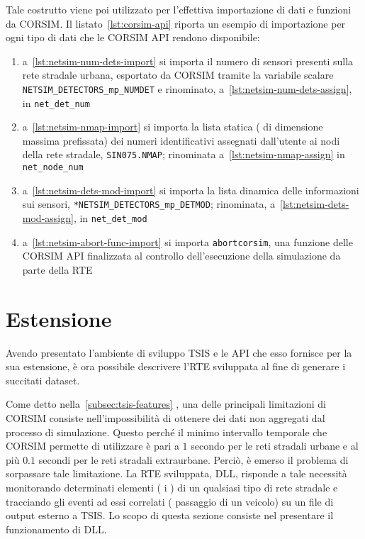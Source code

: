 Tale costrutto viene poi utilizzato per l'effettiva importazione di dati e funzioni da \acs{CORSIM}. Il listato~\ref{lst:corsim-api} riporta un esempio di importazione per ogni tipo di dati che le \acs{CORSIM} \acs{API} rendono disponibile:
\begin{enumerate}
    \item a~\autoref{lst:netsim-num-dets-import} si importa il numero di sensori presenti sulla rete stradale urbana, esportato da \acs{CORSIM} tramite la variabile scalare \lstinline[]|NETSIM_DETECTORS_mp_NUMDET| e rinominato, a~\autoref{lst:netsim-num-dets-assign}, in \lstinline[]|net_det_num|
    \item a~\autoref{lst:netsim-nmap-import} si importa la lista statica (\ie{} di dimensione massima prefissata) dei numeri identificativi assegnati dall'utente ai nodi della rete stradale, \lstinline[]|SIN075.NMAP|; rinominata a~\autoref{lst:netsim-nmap-assign} in \lstinline[]|net_node_num|
    \item a~\autoref{lst:netsim-dets-mod-import} si importa la lista dinamica delle informazioni sui sensori, \lstinline[]|*NETSIM_DETECTORS_mp_DETMOD|; rinominata, a~\autoref{lst:netsim-dets-mod-assign}, in \lstinline[]|net_det_mod|
    \item a~\autoref{lst:netsim-abort-func-import} si importa \lstinline[]|abortcorsim|, una funzione delle \acs{CORSIM} \acs{API} finalizzata al controllo dell'esecuzione della simulazione da parte della \acs{RTE}
\end{enumerate}

\vspace*{8pt}

\cleardoublepage
\section{Estensione}\label{sec:sensors-rte}
Avendo presentato l'ambiente di sviluppo \acs{TSIS} e le \acs{API} che esso fornisce per la sua estensione, è ora possibile descrivere l'\acl{RTE} sviluppata al fine di generare i succitati dataset.

Come detto nella~\autoref{subsec:tsis-features} , una delle principali limitazioni di \acs{CORSIM} consiste nell'impossibilità di ottenere dei dati non aggregati dal processo di simulazione. Questo perché il minimo intervallo temporale che \acs{CORSIM} permette di utilizzare è pari a $1$ secondo per le reti stradali urbane e al più $0.1$ secondi per le reti stradali extraurbane. Perciò, è emerso il problema di sorpassare tale limitazione. La \acs{RTE} sviluppata,  \acs{DLL}, risponde a tale necessità monitorando determinati elementi (\ie{} i ) di un qualsiasi tipo di rete stradale e tracciando gli eventi ad essi correlati (\ie{} passaggio di un veicolo) su un file di output esterno a \acs{TSIS}. Lo scopo di questa sezione consiste nel presentare il funzionamento di  \acs{DLL}.

